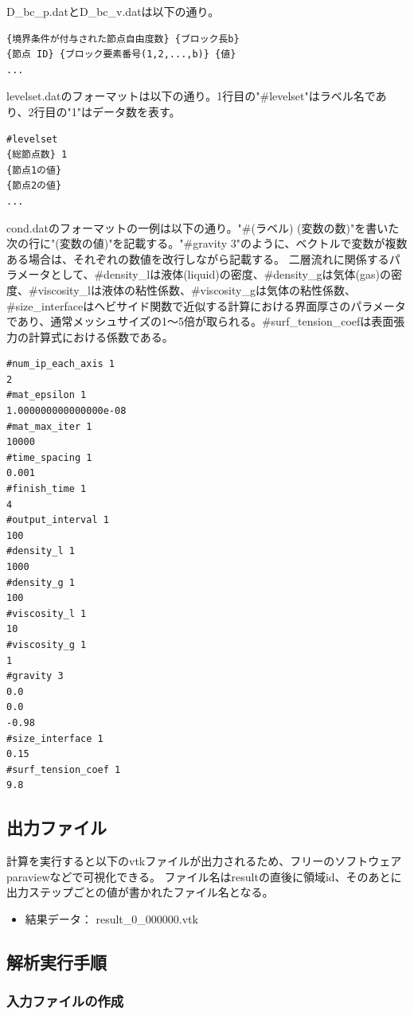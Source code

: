 \documentclass[8pt,a4paper]{article}
\begin{document}
D\_bc\_p.datとD\_bc\_v.datは以下の通り。
\begin{lstlisting}[]
{境界条件が付与された節点自由度数} {ブロック長b}
{節点 ID} {ブロック要素番号(1,2,...,b)} {値}
...
\end{lstlisting}

levelset.datのフォーマットは以下の通り。1行目の"\#levelset"はラベル名であり、2行目の"1"はデータ数を表す。
\begin{lstlisting}[]
#levelset
{総節点数} 1
{節点1の値}
{節点2の値}
...
\end{lstlisting}


cond.datのフォーマットの一例は以下の通り。"\#(ラベル) (変数の数)"を書いた次の行に"(変数の値)"を記載する。"\#gravity 3"のように、ベクトルで変数が複数ある場合は、それぞれの数値を改行しながら記載する。
二層流れに関係するパラメータとして、\#density\_lは液体(liquid)の密度、\#density\_gは気体(gas)の密度、\#viscosity\_lは液体の粘性係数、\#viscosity\_gは気体の粘性係数、\#size\_interfaceはヘビサイド関数で近似する計算における界面厚さのパラメータであり、通常メッシュサイズの1～5倍が取られる。\#surf\_tension\_coefは表面張力の計算式における係数である。
\begin{lstlisting}[]
#num_ip_each_axis 1
2
#mat_epsilon 1
1.000000000000000e-08
#mat_max_iter 1
10000
#time_spacing 1
0.001
#finish_time 1
4
#output_interval 1
100
#density_l 1
1000
#density_g 1
100
#viscosity_l 1
10
#viscosity_g 1
1
#gravity 3
0.0
0.0
-0.98
#size_interface 1
0.15
#surf_tension_coef 1
9.8

\end{lstlisting}

\subsection{出力ファイル}

計算を実行すると以下のvtkファイルが出力されるため、フリーのソフトウェアparaviewなどで可視化できる。
ファイル名はresultの直後に領域id、そのあとに出力ステップごとの値が書かれたファイル名となる。
\begin{itemize}
	\item 結果データ： result\_0\_000000.vtk
\end{itemize}

\subsection{解析実行手順}
\subsubsection{入力ファイルの作成}
\end{document}
